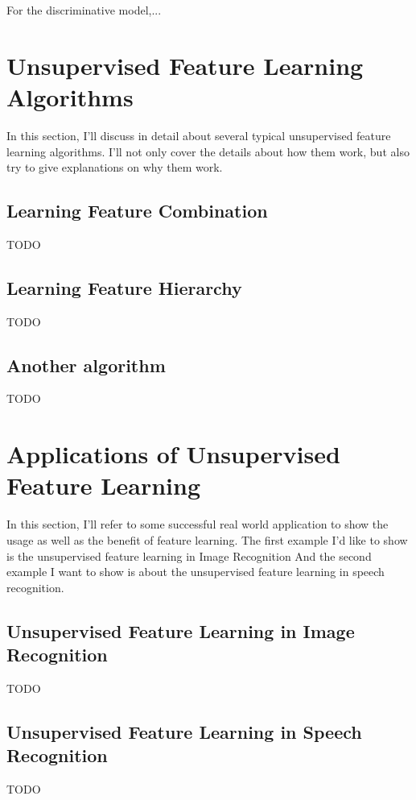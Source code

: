 \documentclass[conference]{IEEEtran}
\begin{document}
For the discriminative model,...





\section{Unsupervised Feature Learning Algorithms}

In this section, I'll discuss in detail about several typical unsupervised feature learning algorithms. I'll not only cover the details about how them work, but also try to give explanations on why them work.


\subsection{Learning Feature Combination}

TODO

\subsection{Learning Feature Hierarchy}

TODO

\subsection{Another algorithm}

TODO

\section{Applications of Unsupervised Feature Learning}

In this section, I'll refer to some successful real world application to show the usage as well as the benefit of feature learning. The first example I'd like to show is the unsupervised feature learning in Image Recognition
And the second example I want to show is about the unsupervised feature learning in speech recognition.

\subsection{Unsupervised Feature Learning in Image Recognition}
TODO

\subsection{Unsupervised Feature Learning in Speech Recognition}
TODO
\end{document}
